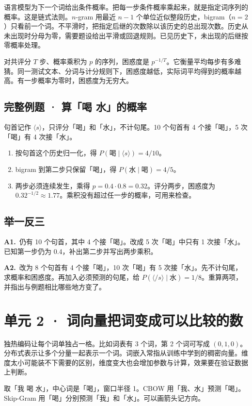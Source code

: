 \documentclass[UTF8,a4paper,11pt]{ctexart}
\newcommand{\PracticeQuestion}[3]{\par\Needspace{4\baselineskip}\noindent\begin{minipage}{\linewidth}\textbf{#1.}\ #2\par\noindent\rule{0pt}{#3mm}\par\end{minipage}\par}
\begin{document}
语言模型为下一个词给出条件概率。把每一步条件概率乘起来，就是指定词序列的概率。这是链式法则。$n$-gram 用最近 $n-1$ 个单位近似整段历史，bigram（$n=2$）只看前一个词。不平滑时，把指定后继的次数除以该历史的总出现次数。历史从未出现时分母为零，需要题设给出平滑或回退规则。已见历史下，未出现的后继按零概率处理。

对共评分 $T$ 步、概率乘积为 $p$ 的序列，困惑度是 $p^{-1/T}$。它衡量平均每步有多难猜。同一测试文本、分词与计分规则下，困惑度越低，实际词平均得到的概率越高。有一步概率为零时，困惑度为无穷大。

\subsection{完整例题 · 算「喝 水」的概率}
句首记作 $\langle s\rangle$，只评分「喝」和「水」，不计句尾。10 个句首有 4 个接「喝」，5 次「喝」有 4 次接「水」。

\begin{enumerate}
\item 按句首这个历史归一化，得 $P(\text{喝}\mid\langle s\rangle)=4/10$。
\item bigram 到第二步只保留「喝」，得 $P(\text{水}\mid\text{喝})=4/5$。
\item 两步必须连续发生，乘得 $p=0.4\cdot0.8=0.32$。评分两步，困惑度为 $0.32^{-1/2}\approx1.77$。乘积没有超过任一步的概率，可用来检查。
\end{enumerate}
\subsection{举一反三}
\PracticeQuestion{A1}{仍有 10 个句首，其中 4 个接「喝」。改成 5 次「喝」中只有 1 次接「水」。已知第一步仍为 0.4，补出第二步并写出两步乘积。}{23}
\PracticeQuestion{A2}{改为 8 个句首有 4 个接「喝」，10 次「喝」有 5 次接「水」。先不计句尾，求概率和困惑度。再加入必须预测的句尾，给 $P(\langle /s\rangle\mid\text{水})=1/8$。重算两项，并指出与例题相比哪些地方变了。}{26}
\clearpage
\section{单元 2 · 词向量把词变成可以比较的数}
独热编码让每个词单独占一格。比如词表有 3 个词，第 2 个词可写成 $(0,1,0)$。分布式表示让多个分量一起表示一个词。词嵌入常指从训练中学到的稠密向量。维度太小可能装不下需要的区别，维度变大也会增加参数与计算，效果要在验证数据上判断。

取「我 喝 水」，中心词是「喝」，窗口半径 1。CBOW 用「我、水」预测「喝」。Skip-Gram 用「喝」分别预测「我」和「水」。可以画箭头记方向。
\end{document}
